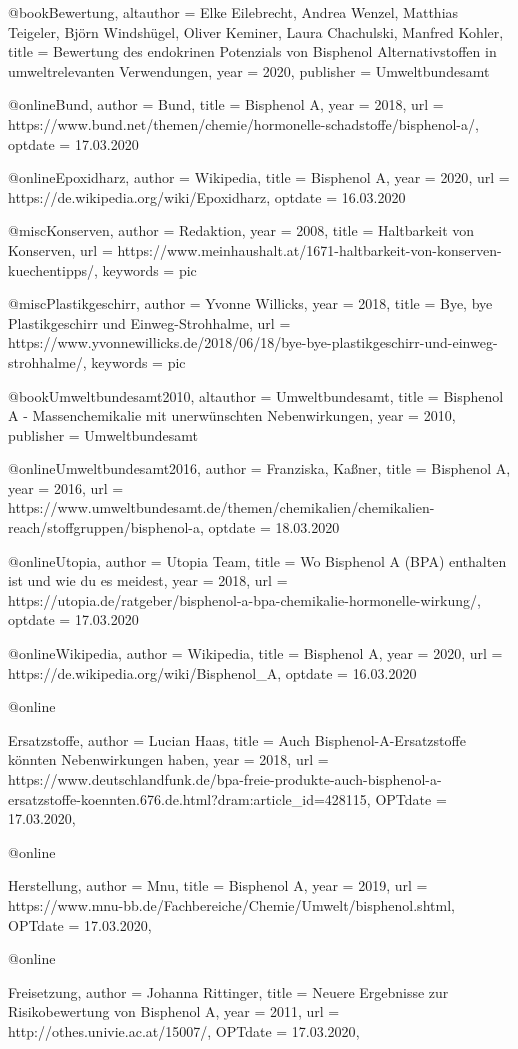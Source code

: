 
@book{Bewertung,
    altauthor = {Elke Eilebrecht, Andrea Wenzel, Matthias Teigeler, Björn Windshügel, Oliver Keminer, Laura Chachulski, Manfred Kohler},
    title     = {Bewertung des endokrinen Potenzials von Bisphenol Alternativstoffen in umweltrelevanten Verwendungen},
    year      = {2020},
    publisher = {Umweltbundesamt}
}

@online{Bund,
    author  = {Bund},
    title   = {Bisphenol A},
    year    = {2018},
    url     = {https://www.bund.net/themen/chemie/hormonelle-schadstoffe/bisphenol-a/},
    optdate = {17.03.2020}
}

@online{Epoxidharz,
    author  = {Wikipedia},
    title   = {Bisphenol A},
    year    = {2020},
    url     = {https://de.wikipedia.org/wiki/Epoxidharz},
    optdate = {16.03.2020}
}

@misc{Konserven,
    author   = {Redaktion},
    year     = {2008},
    title    = {Haltbarkeit von Konserven},
    url      = {https://www.meinhaushalt.at/1671-haltbarkeit-von-konserven-kuechentipps/},
    keywords = {pic}
}

@misc{Plastikgeschirr,
    author   = {Yvonne Willicks},
    year     = {2018},
    title    = {Bye, bye Plastikgeschirr und Einweg-Strohhalme},
    url      = {https://www.yvonnewillicks.de/2018/06/18/bye-bye-plastikgeschirr-und-einweg-strohhalme/},
    keywords = {pic}
}

@book{Umweltbundesamt2010,
    altauthor = {Umweltbundesamt},
    title     = {Bisphenol A - Massenchemikalie mit unerwünschten Nebenwirkungen},
    year      = {2010},
    publisher = {Umweltbundesamt}
}

@online{Umweltbundesamt2016,
    author  = {Franziska, Kaßner},
    title   = {Bisphenol A},
    year    = {2016},
    url     = {https://www.umweltbundesamt.de/themen/chemikalien/chemikalien-reach/stoffgruppen/bisphenol-a},
    optdate = {18.03.2020}
}

@online{Utopia,
    author  = {Utopia Team},
    title   = {Wo Bisphenol A (BPA) enthalten ist und wie du es meidest},
    year    = {2018},
    url     = {https://utopia.de/ratgeber/bisphenol-a-bpa-chemikalie-hormonelle-wirkung/},
    optdate = {17.03.2020}
}

@online{Wikipedia,
    author  = {Wikipedia},
    title   = {Bisphenol A},
    year    = {2020},
    url     = {https://de.wikipedia.org/wiki/Bisphenol_A},
    optdate = {16.03.2020}
}

@online{Ersatzstoffe,
author = {Lucian Haas},
title = {Auch Bisphenol-A-Ersatzstoffe könnten Nebenwirkungen haben},
year = {2018},
url = {https://www.deutschlandfunk.de/bpa-freie-produkte-auch-bisphenol-a-ersatzstoffe-koennten.676.de.html?dram:article_id=428115},
OPTdate = {17.03.2020},

}

@online{Herstellung,
author = {Mnu},
title = {Bisphenol A},
year = {2019},
url = {https://www.mnu-bb.de/Fachbereiche/Chemie/Umwelt/bisphenol.shtml},
OPTdate = {17.03.2020},

}

@online{Freisetzung,
author = {Johanna Rittinger},
title = {Neuere Ergebnisse zur Risikobewertung von Bisphenol A},
year = {2011},
url = {http://othes.univie.ac.at/15007/},
OPTdate = {17.03.2020},

}
